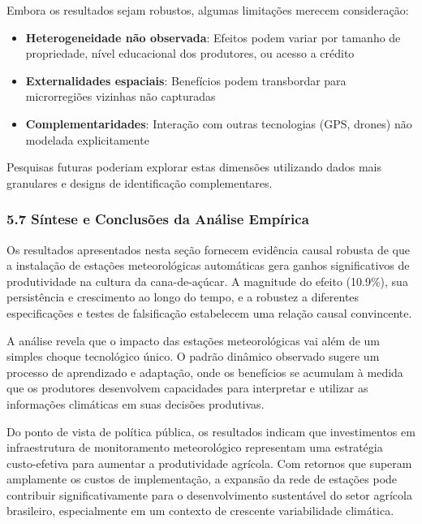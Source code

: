\documentclass[
  brazilian,
  12pt,
  a4paper,
]{article}
\providecommand{\tightlist}{%
  \setlength{\itemsep}{0pt}\setlength{\parskip}{0pt}}
\begin{document}
Embora os resultados sejam robustos, algumas limitações merecem
consideração:

\begin{itemize}
\tightlist
\item
  \textbf{Heterogeneidade não observada}: Efeitos podem variar por
  tamanho de propriedade, nível educacional dos produtores, ou acesso a
  crédito
\item
  \textbf{Externalidades espaciais}: Benefícios podem transbordar para
  microrregiões vizinhas não capturadas
\item
  \textbf{Complementaridades}: Interação com outras tecnologias (GPS,
  drones) não modelada explicitamente
\end{itemize}

Pesquisas futuras poderiam explorar estas dimensões utilizando dados
mais granulares e designs de identificação complementares.

\subsubsection{\texorpdfstring{\textbf{5.7 Síntese e Conclusões da
Análise
Empírica}}{5.7 Síntese e Conclusões da Análise Empírica}}\label{suxedntese-e-conclusuxf5es-da-anuxe1lise-empuxedrica}

Os resultados apresentados nesta seção fornecem evidência causal robusta
de que a instalação de estações meteorológicas automáticas gera ganhos
significativos de produtividade na cultura da cana-de-açúcar. A
magnitude do efeito (10.9\%), sua persistência e crescimento ao longo do
tempo, e a robustez a diferentes especificações e testes de falsificação
estabelecem uma relação causal convincente.

A análise revela que o impacto das estações meteorológicas vai além de
um simples choque tecnológico único. O padrão dinâmico observado sugere
um processo de aprendizado e adaptação, onde os benefícios se acumulam à
medida que os produtores desenvolvem capacidades para interpretar e
utilizar as informações climáticas em suas decisões produtivas.

Do ponto de vista de política pública, os resultados indicam que
investimentos em infraestrutura de monitoramento meteorológico
representam uma estratégia custo-efetiva para aumentar a produtividade
agrícola. Com retornos que superam amplamente os custos de
implementação, a expansão da rede de estações pode contribuir
significativamente para o desenvolvimento sustentável do setor agrícola
brasileiro, especialmente em um contexto de crescente variabilidade
climática.
\end{document}
